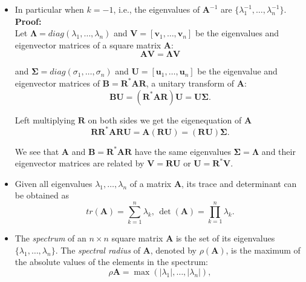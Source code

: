 \documentclass[10pt,b5paper,titlepage]{book}
\begin{document}
\begin{itemize}
\item In particular when $k = -1$, i.e., the eigenvalues of $\mathbf{A}^{-1}$ are $\{\lambda_{1}^{-1},\dots,\lambda_{n}^{-1}\}$.\\

\textbf{Proof:}\\
Let $\mathbf{\Lambda} = \mathit{diag}(\lambda_{1},\dots,\lambda_{n})$ and $\mathbf{V} = [\mathbf{v}_{1},\dots,\mathbf{v}_{n}]$ be the eigenvalues and eigenvector matrices of a square matrix $\mathbf{A}$:
\begin{equation}
\mathbf{A}\mathbf{V} = \mathbf{\Lambda}\mathbf{V}
\end{equation}

and $\mathbf{\Sigma} = \mathit{diag}(\sigma_{1},\dots,\sigma_{n})$ and $\mathbf{U} = [\mathbf{u}_{1},\dots,\mathbf{u}_{n}]$ be the eigenvalue and eigenvector matrices of $\mathbf{B} = \mathbf{R}^{*}\mathbf{A}\mathbf{R}$, a unitary transform of $\mathbf{A}$:
\begin{equation}
\mathbf{B}\mathbf{U} = (\mathbf{R}^{*}\mathbf{A}\mathbf{R})\mathbf{U} = \mathbf{U}\mathbf{\Sigma}
.\end{equation}

Left multiplying $\mathbf{R}$ on both sides we get the eigenequation of $\mathbf{A}$
\begin{equation}
\mathbf{R}\mathbf{R}^{*}\mathbf{A}\mathbf{R}\mathbf{U} = \mathbf{A}(\mathbf{R}\mathbf{U}) = (\mathbf{R}\mathbf{U})\mathbf{\Sigma}
.\end{equation}

We see that $\mathbf{A}$ and $\mathbf{B} = \mathbf{R}^{*}\mathbf{A}\mathbf{R}$ have the same eigenvalues $\mathbf{\Sigma} = \mathbf{\Lambda}$ and their eigenvector matrices are related by $\mathbf{V} = \mathbf{R}\mathbf{U}$ or $\mathbf{U} = \mathbf{R}^{*}\mathbf{V}$.

\item Given all eigenvalues $\lambda_{1},\dots,\lambda_{n}$ of a matrix $\mathbf{A}$, its trace and determinant can be obtained as
\begin{equation}
\mathit{tr}(\mathbf{A}) = \sum_{k=1}^{n}{\lambda_{k}}
\text{, }
\det(\mathbf{A}) = \prod_{k=1}^{n}{\lambda_{k}}
.\end{equation}

\item The \textit{spectrum} of an $n \times n$ square matrix $\mathbf{A}$ is the set of its eigenvalues $\{\lambda_{1},\dots,\lambda_{n}\}$. The \textit{spectral radius} of $\mathbf{A}$, denoted by $\rho(\mathbf{A})$, is the maximum of the absolute values of the elements in the spectrum:
\begin{equation}
\rho\mathbf{A} = \max{(|\lambda_{1}|,\dots,|\lambda_{n}|)}
,\end{equation}


\end{itemize}
\end{document}
